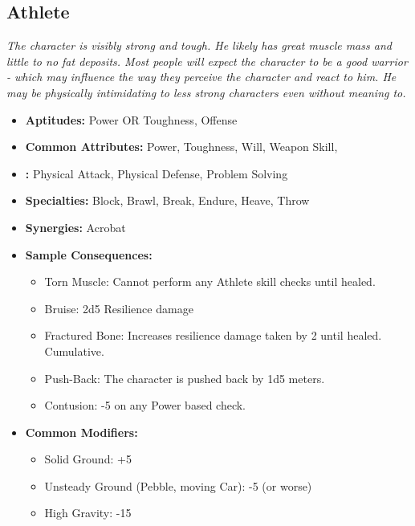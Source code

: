 \subsection{Athlete}\label{Athlete}
\textit{The character is visibly strong and tough.
He likely has great muscle mass and little to no fat deposits.
Most people will expect the character to be a good warrior - which may influence the way they perceive the character and react to him.
He may be physically intimidating to less strong characters even without meaning to.}
\begin{itemize}
	\item \textbf{Aptitudes:} Power OR Toughness, Offense
	\item \textbf{Common Attributes:} Power, Toughness, Will, Weapon Skill, 
	\item \textbf{:} Physical Attack, Physical Defense, Problem Solving
	\item \textbf{Specialties:} Block, Brawl, Break, Endure, Heave, Throw
	\item \textbf{Synergies:} Acrobat
	\item \textbf{Sample Consequences:} 
	\begin{itemize}
		\item Torn Muscle: Cannot perform any Athlete skill checks until healed.
		\item Bruise: 2d5 Resilience damage
		\item Fractured Bone: Increases resilience damage taken by 2 until healed. Cumulative.
		\item Push-Back: The character is pushed back by 1d5 meters.
		\item Contusion: -5 on any Power based check.
	\end{itemize}
	\item \textbf{Common Modifiers:}
	\begin{itemize}
		\item Solid Ground: +5
		\item Unsteady Ground (Pebble, moving Car): -5 (or worse)
		\item High Gravity: -15
	\end{itemize}
\end{itemize}


